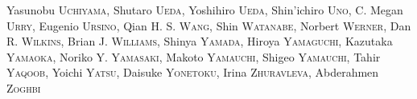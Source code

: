 {Yasunobu \textsc{Uchiyama},
Shutaro \textsc{Ueda},
Yoshihiro \textsc{Ueda},
Shin'ichiro \textsc{Uno},
C. Megan \textsc{Urry},
Eugenio \textsc{Ursino},
Qian H. S. \textsc{Wang},
Shin \textsc{Watanabe},
Norbert \textsc{Werner},
Dan R. \textsc{Wilkins},
Brian J. \textsc{Williams},
Shinya \textsc{Yamada},
Hiroya \textsc{Yamaguchi},
Kazutaka \textsc{Yamaoka},
Noriko Y. \textsc{Yamasaki},
Makoto \textsc{Yamauchi},
Shigeo \textsc{Yamauchi},
Tahir \textsc{Yaqoob},
Yoichi \textsc{Yatsu},
Daisuke \textsc{Yonetoku},
Irina \textsc{Zhuravleva},
Abderahmen \textsc{Zoghbi}%
%
%
}

